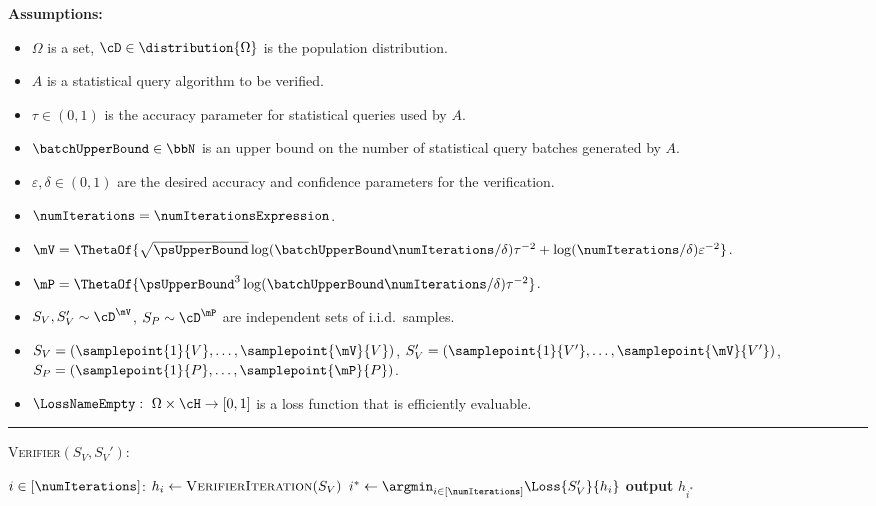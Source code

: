 \documentclass[11pt]{article}
\begin{document}
\begin{protocol}[H]
	\begin{ShadedAlgorithmBox}
		{\bfseries Assumptions:} 
		\begin{itemize}
			\item{
				$\Omega$ is a set, $\cD \in \distribution{\Omega}$ is the population distribution.
			}
			\item{
				$A$ is a statistical query algorithm to be verified.
			}
			\item{
				$\tau \in (0,1)$ is the accuracy parameter for statistical queries used by $A$.
			}
			\item{
				$\batchUpperBound \in \bbN$ is an upper bound on the number of statistical query batches generated by $A$.
			}
			\item{
				$\varepsilon,\delta \in (0,1)$ are the desired accuracy and confidence parameters for the verification.
			}
			\item{
				$\numIterations = \numIterationsExpression$.
			}
			\item{
				$\mV = \ThetaOf{\sqrt{\psUpperBound}\log(\batchUpperBound \numIterations/\delta)\tau^{-2} + \log(\numIterations/\delta)\varepsilon^{-2}}$.
			}
			\item{
				$\mP = \ThetaOf{\psUpperBound^3\log(\batchUpperBound \numIterations/\delta)\tau^{-2}}$.
			}
			\item{
				$S_{V},S_{V}' \sim \cD^{\mV}$, $S_P \sim \cD^{\mP}$ are independent sets of i.i.d.\ samples.
			}
			\item{
				$S_{V} = (\samplepoint{1}{V},\dots,\samplepoint{\mV}{V})$, $S_{V}' = (\samplepoint{1}{V'},\dots,\samplepoint{\mV}{V'})$, $S_P = (\samplepoint{1}{P},\dots,\samplepoint{\mP}{P})$.
			}
			\item{
				$\LossNameEmpty: ~ \Omega \times \cH \rightarrow [0,1]$ is a loss function that is efficiently evaluable.
			}
		\end{itemize}
		
		\noindent\rule{\textwidth}{0.5pt}
		
		\vspace*{0.5em}
		
		\textsc{Verifier}$(S_V, S_V')$:
		\begin{algorithmic}
			\For $i \in [\numIterations]$: 
			\State $h_i \gets \textsc{VerifierIteration}(S_V)$
			\EndFor
			\State $i^* \gets \argmin_{i \in [\numIterations]} \Loss{S_V'}{h_i}$
			\State \textbf{output} $h_{i^*}$
		\end{algorithmic}
		

\end{ShadedAlgorithmBox}
\end{protocol}
\end{document}
